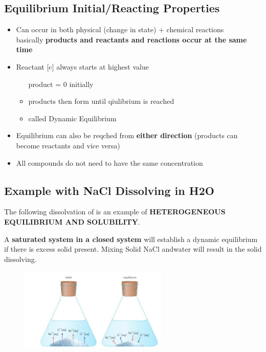 \documentclass{article}
\begin{document}
\subsection{Equilibrium Initial/Reacting Properties}

\begin{itemize}
\item Can occur in both physical (change in state) + chemical reactions \\ basically \textbf{products and reactants and reactions occur at the same time}
\item Reactant [c] always starts at highest value \begin{itemize} \item [product] = 0 initially\item products then form until qiulibrium is reached\item called Dynamic Equilibrium\end{itemize}
\item Equilibrium can also be reqched from \textbf{either direction} (products can become reactants and vice versa)
\item All compounds do not need to have the same concentration
\end{itemize}

\subsection{Example with NaCl Dissolving in H2O}

The following dissolvation of  is an example of \textbf{HETEROGENEOUS EQUILIBRIUM AND SOLUBILITY}. 

A \textbf{saturated system in a closed system} will establish a dynamic equilibrium if there is excess solid present. Mixing Solid NaCl andwater will result in the solid dissolving.

\begin{figure}[H]
\centering
\includegraphics[width=200pt]{3.1fig2.jpg}
\end{figure}
\end{document}
